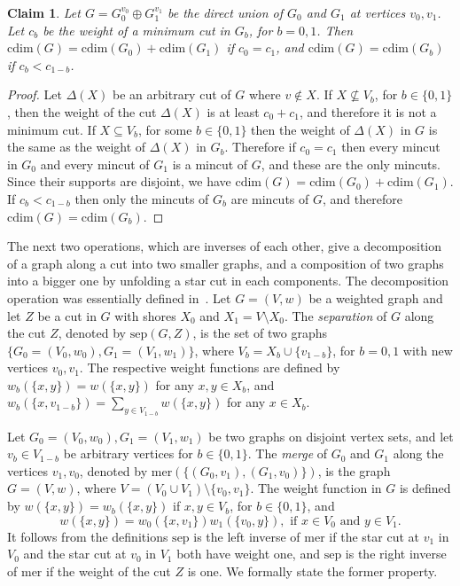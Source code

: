 \documentclass[10pt,a4paper]{article}
\newcommand{\cd}{\mathrm{cdim}}
\newcommand{\sep}{\mathrm{sep}}
\newcommand{\mer}{\mathrm{mer}}
\newcommand{\1}{\mathbf{1}}
\newtheorem{claim}[theorem]{Claim}
\theoremstyle{definition}
\begin{document}
\begin{claim}
\label{claim:directsum}
Let $G = G_0^{v_0} \oplus  G_1^{v_1}$ be the direct union of $G_0$ and $G_1$ at vertices
$v_0, v_1$.
Let $c_b$ be the weight of a minimum cut in $G_b$, for $b=0,1$.
Then $\cd(G) = \cd(G_0) + \cd(G_1)$ if
$c_0 = c_1$, and $\cd(G) = \cd(G_b)$ if $c_b < c_{1-b}$.
\end{claim}

\begin{proof}
Let $\Delta(X)$ be an arbitrary cut of $G$ where $v \not \in X$.
If $X \not \subseteq   V_b$,
for $b \in \{0,1\}$, then
the weight of the cut $\Delta(X)$ is at least $c_0 + c_1$, and therefore
it is not a minimum cut.  If $X \subseteq   V_b$, for some $b \in \{0,1\}$ then
the weight of $\Delta(X)$ in $G$ is the same as the weight of $\Delta(X)$ in $G_b$.
Therefore if $c_0 = c_1$ then every mincut in $G_0$ and
every mincut of $G_1$ is a mincut of $G$, and these are the only mincuts. Since their supports are disjoint,
we have $\cd(G) = \cd(G_0) + \cd(G_1)$. If $c_b < c_{1-b}$ then only the mincuts of $G_b$ are mincuts of $G$,
and therefore $\cd(G) = \cd(G_b)$.
\end{proof}

The next two operations, which are inverses of each other, give a decomposition of a graph along a cut into two smaller graphs, and a composition of two graphs into a bigger one by unfolding a star cut in
each components. The decomposition operation was essentially defined in~\cite{FF09}.
Let $G= (V,w)$ be a weighted graph and let $Z$ be a cut in $G$ with shores $X_0$ and $X_1 = V \setminus X_0$.
The {\em separation} of $G$ along the cut $Z$, denoted by $\sep(G,Z)$, is the set of two
graphs $\{ G_0= (V_0, w_0), G_1 = (V_1,w_1) \}$, where $V_b = X_b \cup \{v_{1-b}\}$, for
$b=0,1$ with new vertices $v_0, v_1$. The respective weight functions are defined by
$w_b (\{x,y\}) = w (\{x,y\}) $ for any $x,y \in X_b$, and $w_b (\{x,v_{1-b}\}) = \sum_{y \in V_{1-b}} w(\{x,y\})$ for any $x\in X_b$.

Let $G_0= (V_0, w_0), G_1 = (V_1,w_1)$ be two graphs on disjoint vertex sets, and let $v_b \in V_{1-b}$
be arbitrary vertices for $b \in \{0,1\}$. The {\em merge} of $G_0$ and $G_1$ along the vertices $v_1, v_0$,
denoted by $\mer( \{ (G_0, v_1), (G_1, v_0) \} )$,
is the graph $G=(V,w)$, where $V = (V_0 \cup V_1) \setminus \{v_0, v_1\}$. The weight function in $G$
is defined by $w (\{x,y\}) = w_b (\{x,y\})$ if $x,y \in V_b$, for $b \in \{0,1\}$, and
\[w (\{x,y\})  = w_0 (\{x,v_1\})  w_1 (\{v_0,y\}), \text{ if } x \in V_0 \text{ and }y \in V_1.\]
It follows from the definitions $\sep$ is the left inverse of $\mer$ if the star cut
at $v_1$ in $V_0$ and the star cut at $v_0$ in $V_1$ both have weight one,
and $\sep$ is the right inverse of $\mer$ if the weight of the cut $Z$ is one. We formally state
the former property.
\end{document}
